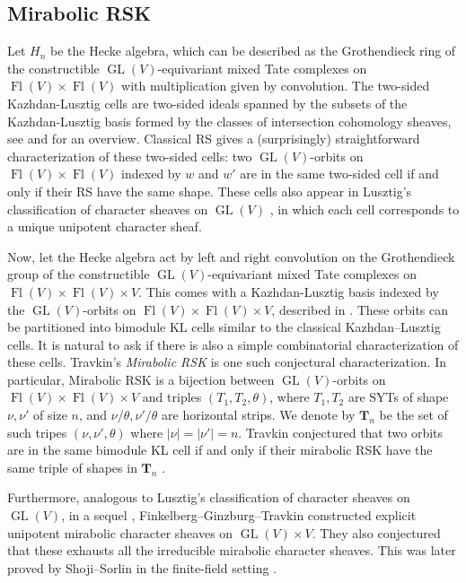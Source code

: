 \documentclass[12pt,a4paper]{article}
\def\Fl{\operatorname{Fl}}
\def\GL{\operatorname{GL}}
\def\FlVV{\Fl(V) \times \Fl(V)}
\theoremstyle{plain}
\theoremstyle{definition}
\theoremstyle{remark}
\newcommand{\bfT}{\mathbf{T}}
\begin{document}
\subsection{Mirabolic RSK}

    Let $H_n$ be the Hecke algebra, which can be described as the Grothendieck ring of the constructible $\GL(V)$-equivariant mixed Tate complexes on $\FlVV$ with multiplication given by convolution. The two-sided Kazhdan-Lusztig cells are two-sided ideals spanned by the subsets of the Kazhdan-Lusztig basis formed by the classes of intersection cohomology sheaves, see \cite{kazhdan1979representations} and \cite{elias2020introduction} for an overview. Classical RS gives a (surprisingly) straightforward characterization of these two-sided cells: two $\GL(V)$-orbits on $\FlVV$ indexed by $w$ and $w'$ are in the same two-sided cell if and only if their RS have the same shape. These cells also appear in Lusztig’s classification of character sheaves on $\GL(V)$ \cite{lusztig2006character}, in which  each cell corresponds to a unique unipotent character sheaf.

    Now, let the Hecke algebra act by left and right convolution on the Grothendieck group of the constructible $\GL(V)$-equivariant mixed Tate complexes on $\FlVV\times V$. This comes with a Kazhdan-Lusztig basis indexed by the $\GL(V)$-orbits on $\FlVV\times V$, described in \cite{magyar1999multiple}. These orbits can be partitioned into bimodule KL cells similar to the classical Kazhdan--Lusztig cells. It is natural to ask if there is also a simple combinatorial characterization of these cells. Travkin's \textit{Mirabolic RSK} \cite{travkin2009mirabolic} is one such conjectural characterization. In particular, Mirabolic RSK is a bijection between $\GL(V)$-orbits on $\FlVV\times V$ and triples $(T_1,T_2,\theta)$, where $T_1,T_2$ are SYTs of shape $\nu,\nu'$ of size $n$, and $\nu/\theta,\nu'/\theta$ are horizontal strips. We denote by $\bfT_n$ be the set of such tripes $(\nu,\nu',\theta)$ where $|\nu| = |\nu'| = n$. Travkin conjectured that two orbits are in the same bimodule KL cell if and only if their mirabolic RSK have the same triple of shapes in $\bfT_n$ \cite[Conjecture 1]{travkin2009mirabolic}.

    Furthermore, analogous to Lusztig's classification of character sheaves on $\GL(V)$, in a sequel \cite{finkelberg2009mirabolic}, Finkelberg--Ginzburg--Travkin constructed explicit unipotent mirabolic character sheaves on $\GL(V) \times V$. They also conjectured that these  exhausts all the irreducible mirabolic character sheaves. This was later proved by Shoji--Sorlin in the finite-field setting \cite{shoji2014exotic}.
\end{document}
